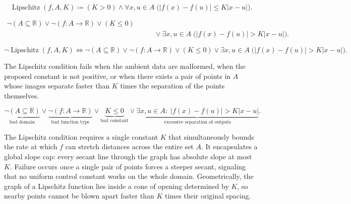 \begin{remark*}
\[
\operatorname{Lipschitz}(f,A,K) \coloneqq (K>0) \land \forall x,u \in A\;\bigl(|f(x)-f(u)| \le K|x-u|\bigr).
\]
\end{remark*}

\begin{remark*}
\[
\begin{aligned}
\neg(A\subseteq\mathbb{R})\lor\neg(f:A\to\mathbb{R})\lor(K\le 0)\\
&\qquad\lor\exists x,u \in A\;\bigl(|f(x)-f(u)| > K|x-u|\bigr).
\end{aligned}
\]
\end{remark*}

\begin{remark*}
\[
\neg \operatorname{Lipschitz}(f,A,K) \Longleftrightarrow
\neg(A\subseteq\mathbb{R})\lor\neg(f:A\to\mathbb{R})\lor(K\le 0)\lor
\exists x,u \in A\;\bigl(|f(x)-f(u)| > K|x-u|\bigr).
\]
\end{remark*}

\begin{remark*}
The Lipschitz condition fails when the ambient data are malformed, when
the proposed constant is not positive, or when there exists a pair of
points in $A$ whose images separate faster than $K$ times the separation
of the points themselves.
\end{remark*}

\begin{remark*}
\[
\underbrace{\neg(A\subseteq\mathbb{R})}_{\text{bad domain}}
\lor
\underbrace{\neg(f:A\to\mathbb{R})}_{\text{bad function type}}
\lor
\underbrace{K\le 0}_{\text{bad constant}}
\lor
\underbrace{\exists x,u \in A:\; |f(x)-f(u)| > K|x-u|}_{\text{excessive separation of outputs}}.
\]
\end{remark*}

\begin{remark*}[Interpretation]
The Lipschitz condition requires a single constant $K$ that simultaneously bounds the rate at which $f$ can stretch distances across the entire set $A$. It encapsulates a global slope cap: every secant line through the graph has absolute slope at most $K$. Failure occurs once a single pair of points forces a steeper secant, signaling that no uniform control constant works on the whole domain. Geometrically, the graph of a Lipschitz function lies inside a cone of opening determined by $K$, so nearby points cannot be blown apart faster than $K$ times their original spacing.
\end{remark*}

